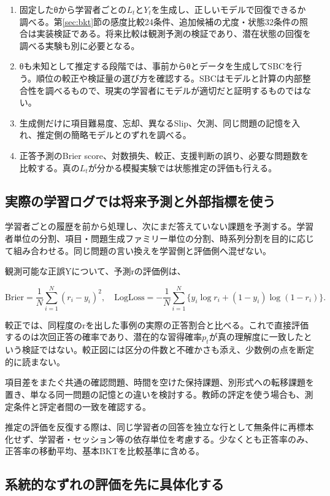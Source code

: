 \documentclass[11pt,a4paper]{article}
\providecommand{\tightlist}{\setlength{\itemsep}{0pt}\setlength{\parskip}{0pt}}
\numberwithin{equation}{section}
\begin{document}
\begin{enumerate}
\def\labelenumi{\arabic{enumi}.}
\tightlist
\item
  固定したθから学習者ごとの$L_t$と$Y_t$を生成し、正しいモデルで回復できるか調べる。第\ref{sec:bkt}節の感度比較24条件、追加候補の尤度・状態32条件の照合は実装検証である。将来比較は観測予測の検証であり、潜在状態の回復を調べる実験も別に必要となる。
\item
  θも未知として推定する段階では、事前からθとデータを生成してSBCを行う\cite{ext5}。順位の較正や検証量の選び方を確認する。SBCはモデルと計算の内部整合性を調べるもので、現実の学習者にモデルが適切だと証明するものではない。
\item
  生成側だけに項目難易度、忘却、異なるSlip、欠測、同じ問題の記憶を入れ、推定側の簡略モデルとのずれを調べる。
\item
  正答予測のBrier score、対数損失、較正、支援判断の誤り、必要な問題数を比較する。真の$L_t$が分かる模擬実験では状態推定の評価も行える。
\end{enumerate}

\subsection{実際の学習ログでは将来予測と外部指標を使う}

学習者ごとの履歴を前から処理し、次にまだ答えていない課題を予測する。学習者単位の分割、項目・問題生成ファミリー単位の分割、時系列分割を目的に応じて組み合わせる。同じ問題の言い換えを学習側と評価側へ混ぜない。

観測可能な正誤Yについて、予測rの評価例は、

\[
\mathrm{Brier}=\frac1N\sum_{i=1}^N(r_i-y_i)^2,
\quad
\mathrm{LogLoss}=-\frac1N\sum_{i=1}^N\{y_i\log r_i+(1-y_i)\log(1-r_i)\}.
\]

較正では、同程度のrを出した事例の実際の正答割合と比べる\cite{ext6}。これで直接評価するのは次回正答の確率であり、潜在的な習得確率$p_t$が真の理解度に一致したという検証ではない。較正図には区分の件数と不確かさも添え、少数例の点を断定的に読まない。

項目差をまたぐ共通の確認問題、時間を空けた保持課題、別形式への転移課題を置き、単なる同一問題の記憶との違いを検討する。教師の評定を使う場合も、測定条件と評定者間の一致を確認する。

推定の評価を反復する際は、同じ学習者の回答を独立な行として無条件に再標本化せず、学習者・セッション等の依存単位を考慮する。少なくとも正答率のみ、正答率の移動平均、基本BKTを比較基準に含める。

\subsection{系統的なずれの評価を先に具体化する}
\end{document}
